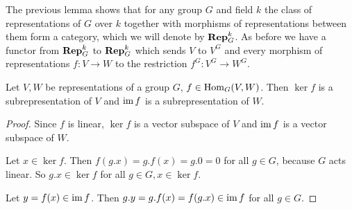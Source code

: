 The previous lemma shows that for any group $G$ and field $k$ the class of representations of $G$ over $k$ together with morphisms of representations between them form a category, which we will denote by $\mathbf{Rep}^k_G$.
As before we have a functor from $\mathbf{Rep}^k_G$ to $\mathbf{Rep}^k_G$ which sends $V$ to $V^G$ and every morphism of representations $f \colon V \to W$ to the restriction $f^G \colon V^G \to W^G$.


\begin{lem}\label{lem: ker and im subrepresentations}
  Let $V,W$ be representations of a group $G$, $f \in \operatorname{Hom}_G(V,W)$.
  Then $\ker f$ is a subrepresentation of $V$ and $\operatorname{im} f$ is a subrepresentation of $W$.
\end{lem}
\begin{proof}
  Since $f$ is linear, $\ker f$ is a vector subspace of $V$ and $\operatorname{im} f$ is a vector subspace of $W$.
  
  Let $x \in \ker f$.
  Then $f(g.x) = g.f(x) = g.0 = 0$ for all $g \in G$, because $G$ acts linear.
  So $g.x \in \ker f$ for all $g \in G, x \in \ker f$.
  
  Let $y = f(x) \in \operatorname{im} f$.
  Then $g.y = g.f(x) = f(g.x) \in \operatorname{im} f$ for all $g \in G$.
\end{proof}


